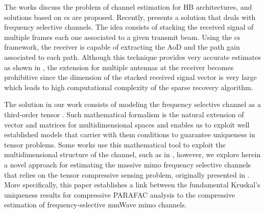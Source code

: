 \documentclass[conference]{IEEEtran}
\begin{document}


The works \cite{Heath:2016,Alkhateeb:2014} discuss the problem of channel
estimation for \gls{HB} architectures, and solutions based on \gls{cs} are
proposed. Recently, \cite{Venugopal:2017} presents a solution that deals
with frequency selective channels. The idea consists of stacking the received signal of
multiple frames each one associated to a given transmit beam. Using the \gls{cs}
framework, the receiver is capable of extracting the \gls{AoD} and the path gain
associated to each path. Although this technique provides very accurate
estimates as shown in \cite{Venugopal:2017},  the extension for 
multiple antennas at the receiver becomes prohibitive since the dimension of the
stacked received signal vector is very large which leads to high computational
complexity of the sparse recovery algorithm.

The solution in our work consists of modeling the frequency selective channel as a
third-order tensor \cite{Kolda:2009,Sidiropoulos:2000}. Such mathematical
formalism is the natural extension of vector and matrices for multidimensional
spaces and enables us to exploit well established models that carrier
with them conditions to guarantee uniqueness in tensor problems. Some works use
this mathematical tool to exploit the multidimensional structure of the channel,
such as in \cite{Zhu:2017,Zhou:2017}, however, we explore herein a novel
approach for estimating the massive \gls{mimo} frequency selective channels that relies on the tensor compressive sensing problem, originally presented in \cite{Sidiropoulos:2012}. More specifically, this paper establishes a link between the fundamental Kruskal's uniqueness results for compressive \gls{PARAFAC} analysis to the compressive estimation of frequency-selective mmWave \gls{mimo} channels.%
\end{document}
